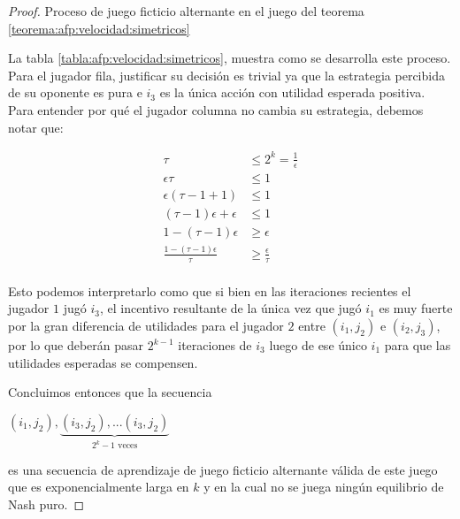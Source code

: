 \begin{proof}
    \begin{table}
        
        \caption{Proceso de juego ficticio alternante en el juego del teorema \ref{teorema:afp:velocidad:simetricos}}
        \label{tabla:afp:velocidad:simetricos}
    \end{table}

    La tabla \ref{tabla:afp:velocidad:simetricos}, muestra como se desarrolla este proceso. Para el jugador fila, justificar su decisión es trivial ya que la estrategia percibida de su oponente es pura e $i_3$ es la única acción con utilidad esperada positiva. Para entender por qué el jugador columna no cambia su estrategia, debemos notar que:

    \begin{align*}
        \tau &\le 2^k = \frac{1}{\epsilon} \\
        \epsilon \tau&\le 1 \\
        \epsilon (\tau - 1 + 1) &\le 1\\
        (\tau - 1) \epsilon + \epsilon &\le 1\\
        1-(\tau-1)\epsilon &\ge \epsilon \\
        \frac{1-(\tau-1)\epsilon}{\tau} &\ge \frac{\epsilon}{\tau} \\
    \end{align*}

    Esto podemos interpretarlo como que si bien en las iteraciones recientes el jugador $1$ jugó $i_3$, el incentivo resultante de la única vez que jugó $i_1$ es muy fuerte por la gran diferencia de utilidades para el jugador $2$ entre $(i_1, j_2)$ e $(i_2, j_3)$, por lo que deberán pasar $2^{k-1}$ iteraciones de $i_3$ luego de ese único $i_1$ para que las utilidades esperadas se compensen.

    Concluimos entonces que la secuencia

    \begin{center}
    \begin{math}
        (i_1, j_2), \underbrace{(i_3, j_2), ... (i_3, j_2)}_{\text{$2^k - 1$ veces}}
    \end{math}
    \end{center}

    es una secuencia de aprendizaje de juego ficticio alternante válida de este juego que es exponencialmente larga en $k$ y en la cual no se juega ningún equilibrio de Nash puro.

\end{proof}

